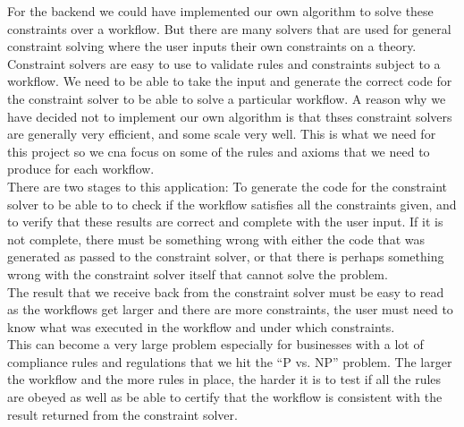 \documentclass[a4paper]{report}
\begin{document}
For the backend we could have implemented our own algorithm to solve these constraints over a workflow. But there are many solvers that are used for general constraint solving where the user inputs their own constraints on a theory. Constraint solvers are easy to use to validate rules and constraints subject to a workflow. We need to be able to take the input and generate the correct code for the constraint solver to be able to solve a particular workflow. A reason why we have decided not to implement our own algorithm is that thses constraint solvers are generally very efficient, and some scale very well. This is what we need for this project so we cna focus on some of the rules and axioms that we need to produce for each workflow. \\

There are two stages to this application: To generate the code for the constraint solver to be able to to check if the workflow satisfies all the constraints given, and to verify that these results are correct and complete with the user input. If it is not complete, there must be something wrong with either the code that was generated as passed to the constraint solver, or that there is perhaps something wrong with the constraint solver itself that cannot solve the problem. \\

The result that we receive back from the constraint solver must be easy to read as the workflows get larger and there are more constraints, the user must need to know what was executed in the workflow and under which constraints. \\

This can become a very large problem especially for businesses with a lot of compliance rules and regulations that we hit the ``P vs. NP'' problem. The larger the workflow and the more rules in place, the harder it is to test if all the rules are obeyed as well as be able to certify that the workflow is consistent with the result returned from the constraint solver. \\
\end{document}
